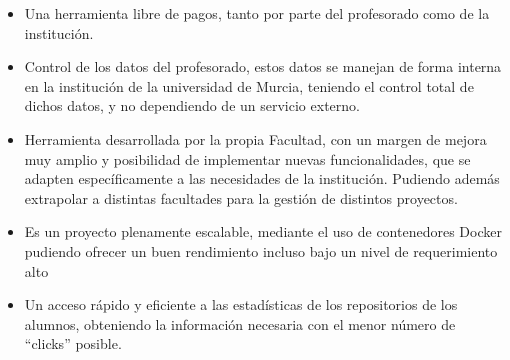 \begin{itemize}
\item Una herramienta libre de pagos, tanto por parte del profesorado como
  de la institución.
\item Control de los datos del profesorado, estos datos se manejan de forma
  interna en la institución de la universidad de Murcia, teniendo el
  control total de dichos datos, y no dependiendo de un servicio externo.
\item Herramienta desarrollada por la propia Facultad, con un margen de
  mejora muy amplio y posibilidad de implementar nuevas funcionalidades,
  que se adapten específicamente a las necesidades de la institución.
  Pudiendo además extrapolar a distintas facultades para la gestión de
  distintos proyectos.
\item Es un proyecto plenamente escalable, mediante el uso de contenedores
  Docker pudiendo ofrecer un buen rendimiento incluso bajo un nivel de
  requerimiento alto
\item Un acceso rápido y eficiente a las estadísticas de los repositorios
  de los alumnos, obteniendo la información necesaria con el menor número
  de ``clicks'' posible.
\end{itemize}


